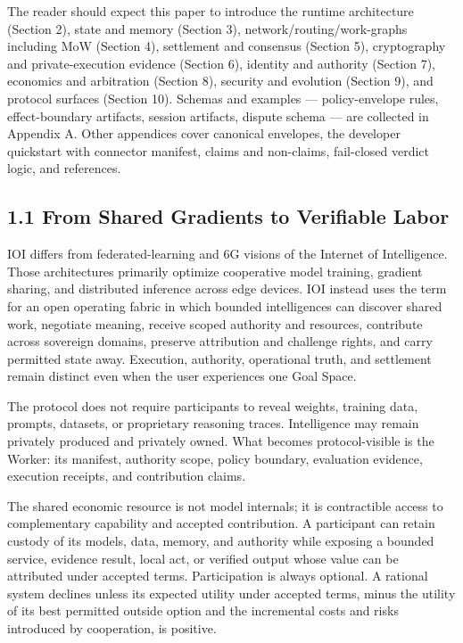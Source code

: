 \documentclass[
  11pt,
]{article}
\begin{document}
The reader should expect this paper to introduce the runtime
architecture (Section 2), state and memory (Section 3),
network/routing/work-graphs including MoW (Section 4), settlement and
consensus (Section 5), cryptography and private-execution evidence (Section 6),
identity and authority (Section 7), economics and arbitration (Section
8), security and evolution (Section 9), and protocol surfaces (Section
10). Schemas and examples --- policy-envelope rules, effect-boundary artifacts, session
artifacts, dispute schema --- are collected in Appendix A. Other
appendices cover canonical envelopes, the developer quickstart with
connector manifest, claims and non-claims, fail-closed verdict logic,
and references.

\hypertarget{from-shared-gradients-to-verifiable-labor}{%
\subsection{1.1 From Shared Gradients to Verifiable
Labor}\label{from-shared-gradients-to-verifiable-labor}}

IOI differs from federated-learning and 6G visions of the Internet of
Intelligence. Those architectures primarily optimize cooperative model
training, gradient sharing, and distributed inference across edge
devices. IOI instead uses the term for an open operating fabric in which
bounded intelligences can discover shared work, negotiate meaning,
receive scoped authority and resources, contribute across sovereign
domains, preserve attribution and challenge rights, and carry permitted
state away. Execution, authority, operational truth, and settlement
remain distinct even when the user experiences one Goal Space.

The protocol does not require participants to reveal weights, training
data, prompts, datasets, or proprietary reasoning traces. Intelligence
may remain privately produced and privately owned. What becomes
protocol-visible is the Worker: its manifest, authority scope, policy
boundary, evaluation evidence, execution receipts, and contribution
claims.

The shared economic resource is not model internals; it is contractible access
to complementary capability and accepted contribution. A participant can
retain custody of its models, data, memory, and authority while exposing a
bounded service, evidence result, local act, or verified output whose value can
be attributed under accepted terms. Participation is always optional. A
rational system declines unless its expected utility under accepted terms,
minus the utility of its best permitted outside option and the incremental
costs and risks introduced by cooperation, is positive.
\end{document}
